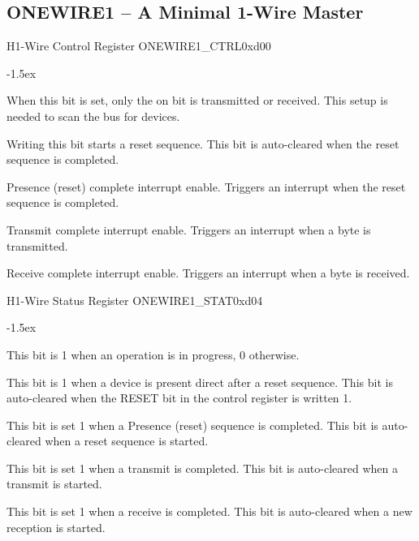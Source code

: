 \documentclass[12pt]{article}
\begin{document}
\subsection{ONEWIRE1 -- A Minimal 1-Wire Master}
\begin{register}{H}{1-Wire Control Register ONEWIRE1\_CTRL}{0xd00}
\label{onewire1ctrl}
%
%
%
%
%
%
\regnewline%
\end{register}
\begin{regdesc}[0.8\textwidth]\begin{reglist}[000000000]
\itemsep-1.5ex
\item [ONEBIT] When this bit is set, only the on bit is transmitted or received. This setup is needed to scan the bus for devices.
\item [RESET] Writing this bit starts a reset sequence. This bit is auto-cleared when the reset sequence is completed.
\item [PCIE] Presence (reset) complete interrupt enable. Triggers an interrupt when the reset sequence is completed.
\item [TCIE] Transmit complete interrupt enable. Triggers an interrupt when a byte is transmitted.
\item [RCIE] Receive complete interrupt enable. Triggers an interrupt when a byte is received.
\end{reglist}\end{regdesc}

\begin{register}{H}{1-Wire Status Register ONEWIRE1\_STAT}{0xd04}
%
%
%
%
%
%
%
\regnewline%
\end{register}
\begin{regdesc}[0.8\textwidth]\begin{reglist}[000000000]
\itemsep-1.5ex
\item [BUSY] This bit is 1 when an operation is in progress, 0 otherwise.
\item [PRESENCE] This bit is 1 when a device is present direct after a reset sequence. This bit is auto-cleared when the RESET bit in the control register is written 1.
\item [PC] This bit is set 1 when a Presence (reset) sequence is completed. This bit is auto-cleared when a reset sequence is started.
\item [TC] This bit is set 1 when a transmit is completed. This bit is auto-cleared when a transmit is started.
\item [RC] This bit is set 1 when a receive is completed. This bit is auto-cleared when a new reception is started.
\end{reglist}\end{regdesc}
\end{document}
